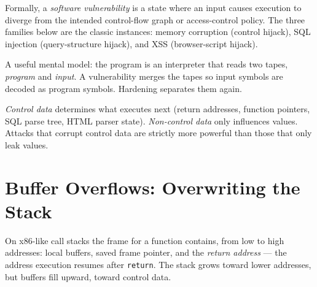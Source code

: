 Formally, a \emph{software vulnerability} is a state where an input causes execution to diverge from the intended control-flow graph or access-control policy. The three families below are the classic instances: memory corruption (control hijack), SQL injection (query-structure hijack), and XSS (browser-script hijack).

A useful mental model: the program is an interpreter that reads two tapes, \emph{program} and \emph{input}. A vulnerability merges the tapes so input symbols are decoded as program symbols. Hardening separates them again.

\begin{definition}
\emph{Control data} determines what executes next (return addresses, function pointers, SQL parse tree, HTML parser state). \emph{Non-control data} only influences values. Attacks that corrupt control data are strictly more powerful than those that only leak values.
\end{definition}

\section{Buffer Overflows: Overwriting the Stack}
\label{sec:buffer-overflow}
On x86-like call stacks the frame for a function contains, from low to high addresses: local buffers, saved frame pointer, and the \emph{return address} --- the address execution resumes after \texttt{return}. The stack grows toward lower addresses, but buffers fill upward, toward control data.

